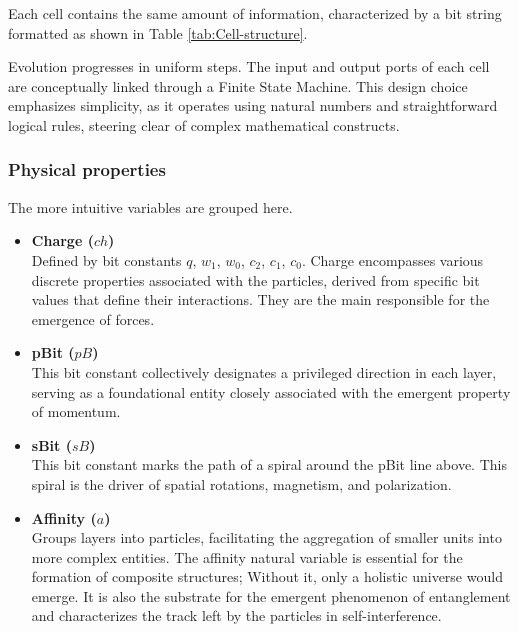 \documentclass[12pt]{article}
\begin{document}
Each cell contains the same amount of information, characterized by a bit string formatted as shown in Table \ref{tab:Cell-structure}.

Evolution progresses in uniform steps. The input and output ports of each cell are conceptually linked through a Finite State Machine. This design choice emphasizes simplicity, as it operates using natural numbers and straightforward logical rules, steering clear of complex mathematical constructs.

\subsubsection{Physical properties}
The more intuitive variables are grouped here.
\begin{itemize}
    \item \textbf{Charge ($ch$)} \\
Defined by bit constants $q$, $w_{1}$, $w_{0}$, $c_{2}$, $c_{1}$, $c_{0}$.
Charge encompasses various discrete properties associated with the particles, derived from specific bit values that define their interactions. They are the main responsible for the emergence of forces.

\item \textbf{pBit ($pB$)} \\
This bit constant collectively designates a privileged direction in each layer, serving as a foundational entity closely associated with the emergent property of momentum.

\item \textbf{sBit ($sB$)} \\
This bit constant marks the path of a spiral around the pBit line above. This spiral is the driver of spatial rotations, magnetism, and polarization.

\item \textbf{Affinity ($a$)} \\
    Groups layers into particles, facilitating the aggregation of smaller units into more complex entities. The affinity natural variable is essential for the formation of composite structures; Without it, only a holistic universe would emerge. It is also the substrate for the emergent phenomenon of entanglement and characterizes the track left by the particles in self-interference.
\end{itemize}
\end{document}
